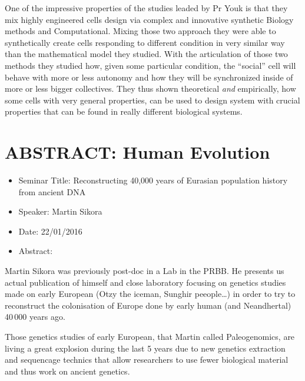 \documentclass[10pt,letterpaper]{article}
\begin{document}
One of the impressive properties of the studies leaded by Pr Youk is that they mix highly engineered cells design via complex and innovative synthetic Biology methods and Computational. Mixing those two approach they were able to synthetically create cells responding to different condition in very similar way than the mathematical model they studied.  With the articulation of those two methods they studied how, given some particular condition, the ``social'' cell will behave with more or less autonomy and how they will be synchronized inside of more or less bigger collectives. They thus shown theoretical \emph{and} empirically, how some cells with very general properties, can be used to design system with crucial properties that can be found in really different biological systems. 


%
%
%
%


\section{ABSTRACT: Human Evolution}

\begin{itemize}
    \item Seminar Title: Reconstructing 40,000 years of Eurasian population history from ancient DNA
    \item Speaker: Martin Sikora
    \item Date: 22/01/2016
    \item Abstract: 
\end{itemize}

Martin Sikora was previously post-doc in a Lab in the PRBB. He presents us actual publication of himself and close laboratory focusing on genetics studies made on early European (Otzy the iceman, Sunghir peeople\ldots) in order to try to reconstruct the colonisation of Europe done by early human (and Neandhertal) 40\,000 years ago.

Those genetics studies of early European, that Martin called Paleogenomics, are living a great explosion during the last 5 years due to new genetics extraction and sequencage technics that allow researchers to use fewer biological material and thus work on ancient genetics.
\end{document}
